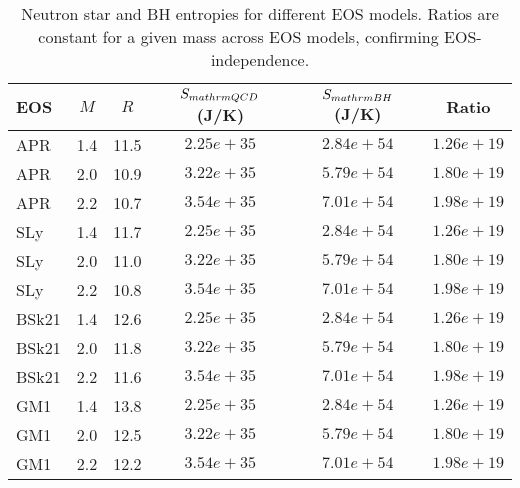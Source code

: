 \begin{table*}[h]
\centering
\caption{Neutron star and BH entropies for different EOS models. Ratios are constant for a given mass across EOS models, confirming EOS-independence.}
\label{tab:eoscompare}
\begin{tabular}{lccccc}
\hline\hline
EOS & $M$ & $R$ & $S_{\\mathrm{QCD}}$ (J/K) & $S_{\\mathrm{BH}}$ (J/K) & Ratio \\
\hline
APR & 1.4 & 11.5 & $2.25e+35$ & $2.84e+54$ & $1.26e+19$ \\
APR & 2.0 & 10.9 & $3.22e+35$ & $5.79e+54$ & $1.80e+19$ \\
APR & 2.2 & 10.7 & $3.54e+35$ & $7.01e+54$ & $1.98e+19$ \\
SLy & 1.4 & 11.7 & $2.25e+35$ & $2.84e+54$ & $1.26e+19$ \\
SLy & 2.0 & 11.0 & $3.22e+35$ & $5.79e+54$ & $1.80e+19$ \\
SLy & 2.2 & 10.8 & $3.54e+35$ & $7.01e+54$ & $1.98e+19$ \\
BSk21 & 1.4 & 12.6 & $2.25e+35$ & $2.84e+54$ & $1.26e+19$ \\
BSk21 & 2.0 & 11.8 & $3.22e+35$ & $5.79e+54$ & $1.80e+19$ \\
BSk21 & 2.2 & 11.6 & $3.54e+35$ & $7.01e+54$ & $1.98e+19$ \\
GM1 & 1.4 & 13.8 & $2.25e+35$ & $2.84e+54$ & $1.26e+19$ \\
GM1 & 2.0 & 12.5 & $3.22e+35$ & $5.79e+54$ & $1.80e+19$ \\
GM1 & 2.2 & 12.2 & $3.54e+35$ & $7.01e+54$ & $1.98e+19$ \\
\hline\hline
\end{tabular}
\end{table*}
